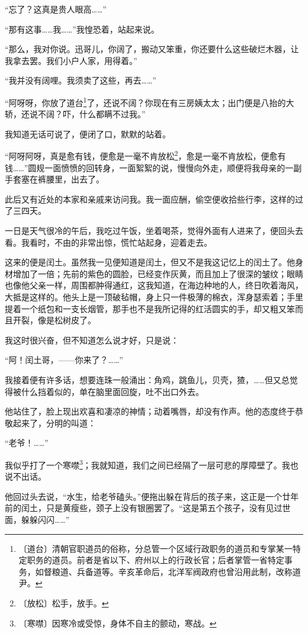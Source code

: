 \documentclass[12pt,UTF-8,openany]{ctexbook}
\begin{document}
\begin{large}
    “忘了？这真是贵人眼高……”
    
    “那有这事……我……”我惶恐着，站起来说。
    
    “那么，我对你说。迅哥儿，你阔了，搬动又笨重，你还要什么这些破烂木器，让我拿去罢。我们小户人家，用得着。”
    
    “我并没有阔哩。我须卖了这些，再去……”
    
    “阿呀呀，你放了道台\footnote{〔道台〕清朝官职道员的俗称，分总管一个区域行政职务的道员和专掌某一特定职务的道员。前者是省以下、府州以上的行政长官；后者掌管一省特定事务，如督粮道、兵备道等。辛亥革命后，北洋军阀政府也曾沿用此制，改称道尹。}了，还说不阔？你现在有三房姨太太；出门便是八抬的大轿，还说不阔？吓，什么都瞒不过我。”
    
    我知道无话可说了，便闭了口，默默的站着。
    
    “阿呀阿呀，真是愈有钱，便愈是一毫不肯放松\footnote{〔放松〕松手，放手。}，愈是一毫不肯放松，便愈有钱……”圆规一面愤愤的回转身，一面絮絮的说，慢慢向外走，顺便将我母亲的一副手套塞在裤腰里，出去了。
    
    此后又有近处的本家和亲戚来访问我。我一面应酬，偷空便收拾些行李，这样的过了三四天。
    
    一日是天气很冷的午后，我吃过午饭，坐着喝茶，觉得外面有人进来了，便回头去看。我看时，不由的非常出惊，慌忙站起身，迎着走去。
    
    这来的便是闰土。虽然我一见便知道是闰土，但又不是我这记忆上的闰土了。他身材增加了一倍；先前的紫色的圆脸，已经变作灰黄，而且加上了很深的皱纹；眼睛也像他父亲一样，周围都肿得通红，这我知道，在海边种地的人，终日吹着海风，大抵是这样的。他头上是一顶破毡帽，身上只一件极薄的棉衣，浑身瑟索着；手里提着一个纸包和一支长烟管，那手也不是我所记得的红活圆实的手，却又粗又笨而且开裂，像是松树皮了。
    
    我这时很兴奋，但不知道怎么说才好，只是说：
    
    “阿！闰土哥，——你来了？……”
    
    我接着便有许多话，想要连珠一般涌出：角鸡，跳鱼儿，贝壳，猹，……但又总觉得被什么挡着似的，单在脑里面回旋，吐不出口外去。
    
    他站住了，脸上现出欢喜和凄凉的神情；动着嘴唇，却没有作声。他的态度终于恭敬起来了，分明的叫道：
    
    “老爷！……”
    
    我似乎打了一个寒噤\footnote{〔寒噤〕因寒冷或受惊，身体不自主的颤动，寒战。}；我就知道，我们之间已经隔了一层可悲的厚障壁了。我也说不出话。
    
    他回过头去说，“水生，给老爷磕头。”便拖出躲在背后的孩子来，这正是一个廿年前的闰土，只是黄瘦些，颈子上没有银圈罢了。“这是第五个孩子，没有见过世面，躲躲闪闪……”
    

\end{large}
\end{document}
